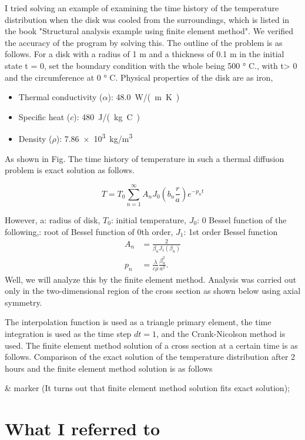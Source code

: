 I tried solving an example of examining the time history of the temperature distribution when the disk was cooled from the surroundings, which is listed in the book "Structural analysis example using finite element method". We verified the accuracy of the program by solving this. The outline of the problem is as follows.
%
For a disk with a radius of 1 m and a thickness of 0.1 m in the initial state t = 0, set the boundary condition with the whole being 500 ° C., with t> 0 and the circumference at 0 ° C. Physical properties of the disk are as iron,
%
\begin{itemize}
\item Thermal conductivity ($\alpha$): \SI{48.0}{ \watt /(\meter K)}
\item Specific heat ($c$): \SI{480}{\joule /(\kilogram C)}
\item Density ($\rho$): \num{7.86e3}\SI{}{\kilogram / \meter ^3}
\end{itemize}
%
As shown in Fig. The time history of temperature in such a thermal diffusion problem is exact solution as follows.

\begin{equation}
T=T_0\sum_{n=1}^{\infty} A_n J_0\left(b_n\frac{r}{a}\right)e^{-p_n t}
\end{equation}

However, a: radius of disk, $T_0$: initial temperature, $J_0$: 0 Bessel function of the following,: root of Bessel function of 0th order, $J_1$: 1st order Bessel function
%
\begin{align}
A_n&=\frac{2}{\beta_n J_1(\beta_n)}\\
p_n&=\frac{\lambda}{c\rho}\frac{\beta_n^2}{a^2}.
\end{align}
%
Well, we will analyze this by the finite element method. Analysis was carried out only in the two-dimensional region of the cross section as shown below using axial symmetry.



The interpolation function is used as a triangle primary element, the time integration is used as the time step $dt=1$, and the Crank-Nicolson method is used. The finite element method solution of a cross section at a certain time is as follows.
Comparison of the exact solution of the temperature distribution after 2 hours and the finite element method solution is as follows


& marker (It turns out that finite element method solution fits exact solution);
\section{What I referred to}
